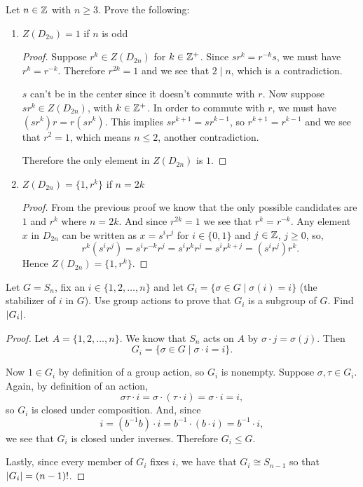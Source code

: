  Let $n\in\mathbb{Z}$ with $n\geq3$. Prove the following:
\begin{enumerate}
\item $Z(D_{2n}) = 1$ if $n$ is odd
  \begin{proof}
    Suppose $r^k\in Z(D_{2n})$ for $k\in\mathbb{Z}^+$. Since $sr^k = r^{-k}s$,
    we must have $r^k = r^{-k}$. Therefore $r^{2k} = 1$ and we see
    that $2 \mid n$, which is a contradiction.

    $s$ can't be in the center since it doesn't commute with $r$. Now
    suppose $sr^k\in Z(D_{2n})$, with $k\in\mathbb{Z}^+$. In order to commute
    with $r$, we must have $(sr^k)r = r(sr^k)$. This implies
    $sr^{k+1} = sr^{k-1}$, so $r^{k+1} = r^{k-1}$ and we see that
    $r^2 = 1$, which means $n \leq 2$, another contradiction.

    Therefore the only element in $Z(D_{2n})$ is $1$.
  \end{proof}
\item $Z(D_{2n}) = \{1,r^k\}$ if $n = 2k$
  \begin{proof}
    From the previous proof we know that the only possible candidates
    are $1$ and $r^k$ where $n = 2k$. And since $r^{2k} = 1$ we see
    that $r^k = r^{-k}$. Any element $x$ in $D_{2n}$ can be written as
    $x = s^ir^j$ for $i\in\{0,1\}$ and $j\in\mathbb{Z}$, $j\geq 0$, so,
    \begin{equation*}
      r^k(s^ir^j) = s^ir^{-k}r^j = s^ir^kr^j = s^ir^{k+j} = (s^ir^j)r^k.
    \end{equation*}
    Hence $Z(D_{2n}) = \{1, r^k\}$.
  \end{proof}
\end{enumerate}

 Let $G = S_n$, fix an $i\in\{1,2,\dots,n\}$ and let
$G_i = \{\sigma\in G\mid\sigma(i) = i\}$ (the stabilizer of $i$ in
$G$). Use group actions to prove that $G_i$ is a subgroup of $G$. Find
$\lvert{G_i}\rvert$.
\begin{proof}
  Let $A = \{1,2,\dots,n\}$. We know that $S_n$ acts on $A$ by
  $\sigma\cdot j = \sigma(j)$. Then
  \begin{equation*}
    G_i = \{\sigma\in G\mid \sigma\cdot i = i\}.
  \end{equation*}

  Now $1\in G_i$ by definition of a group action, so $G_i$ is
  nonempty. Suppose $\sigma, \tau\in G_i$. Again, by definition of an
  action,
  \begin{equation*}
    \sigma\tau\cdot i = \sigma\cdot(\tau\cdot i) = \sigma\cdot i = i,
  \end{equation*}
  so $G_i$ is closed under composition. And, since
  \begin{equation*}
    i = (b^{-1}b)\cdot i = b^{-1}\cdot(b\cdot i) = b^{-1}\cdot i,
  \end{equation*}
  we see that $G_i$ is closed under inverses. Therefore $G_i\leq G$.

  Lastly, since every member of $G_i$ fixes $i$, we have that
  $G_i\cong S_{n-1}$ so that $\lvert{G_i}\rvert = (n-1)!$.
\end{proof}

